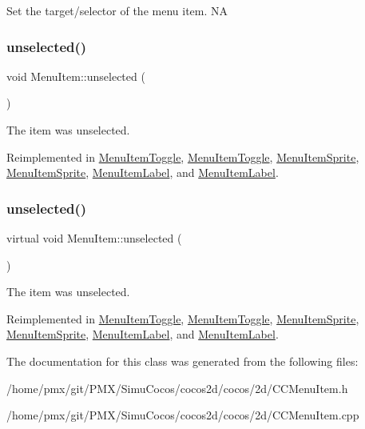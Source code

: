 Set the target/selector of the menu item.  NA \mbox{\label{classMenuItem_a3abeecc6d59ada50f4123e3e36ae4892}} 
\subsubsection{\texorpdfstring{unselected()}{unselected()}\hspace{0.1cm}{\footnotesize\ttfamily [1/2]}}
{\footnotesize\ttfamily void Menu\+Item\+::unselected (\begin{DoxyParamCaption}{ }\end{DoxyParamCaption})\hspace{0.3cm}{\ttfamily [virtual]}}

The item was unselected. 

Reimplemented in \hyperlink{classMenuItemToggle_a38e606a195f699ea8bb839e1a2ae6565}{Menu\+Item\+Toggle}, \hyperlink{classMenuItemToggle_a00dd7e523e262f4264ea1e73587a4b87}{Menu\+Item\+Toggle}, \hyperlink{classMenuItemSprite_a22671f2793757b6e4a528dd8bb393fe1}{Menu\+Item\+Sprite}, \hyperlink{classMenuItemSprite_abdc49b1b264349807eae52aa96472abf}{Menu\+Item\+Sprite}, \hyperlink{classMenuItemLabel_a1932cfa5621f3f8a9ce74f374aab04cd}{Menu\+Item\+Label}, and \hyperlink{classMenuItemLabel_ac2cc529a524150093ba996f90f150267}{Menu\+Item\+Label}.

\mbox{\label{classMenuItem_a515f26e1cfec9e1f46bdd898c5698723}} 
\subsubsection{\texorpdfstring{unselected()}{unselected()}\hspace{0.1cm}{\footnotesize\ttfamily [2/2]}}
{\footnotesize\ttfamily virtual void Menu\+Item\+::unselected (\begin{DoxyParamCaption}{ }\end{DoxyParamCaption})\hspace{0.3cm}{\ttfamily [virtual]}}

The item was unselected. 

Reimplemented in \hyperlink{classMenuItemToggle_a38e606a195f699ea8bb839e1a2ae6565}{Menu\+Item\+Toggle}, \hyperlink{classMenuItemToggle_a00dd7e523e262f4264ea1e73587a4b87}{Menu\+Item\+Toggle}, \hyperlink{classMenuItemSprite_a22671f2793757b6e4a528dd8bb393fe1}{Menu\+Item\+Sprite}, \hyperlink{classMenuItemSprite_abdc49b1b264349807eae52aa96472abf}{Menu\+Item\+Sprite}, \hyperlink{classMenuItemLabel_a1932cfa5621f3f8a9ce74f374aab04cd}{Menu\+Item\+Label}, and \hyperlink{classMenuItemLabel_ac2cc529a524150093ba996f90f150267}{Menu\+Item\+Label}.



The documentation for this class was generated from the following files\+:\begin{DoxyCompactItemize}
\item 
/home/pmx/git/\+P\+M\+X/\+Simu\+Cocos/cocos2d/cocos/2d/C\+C\+Menu\+Item.\+h\item 
/home/pmx/git/\+P\+M\+X/\+Simu\+Cocos/cocos2d/cocos/2d/C\+C\+Menu\+Item.\+cpp\end{DoxyCompactItemize}
